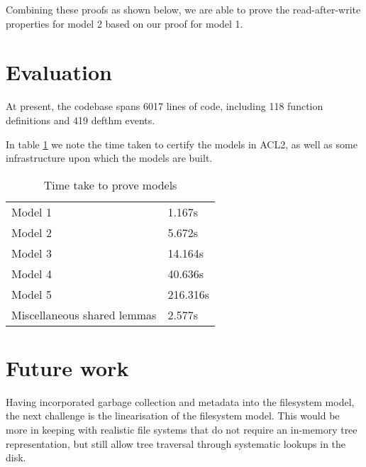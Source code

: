 \documentclass[format=sigconf,review=true]{acmart}
\begin{document}
Combining these proofs as shown below, we are able to prove the read-after-write
properties for model 2 based on our proof for model 1.


\section{Evaluation}
At present, the codebase spans 6017 lines of code, including 118
function definitions and 419 defthm events.

In table \ref{certification-timing-table} we note the time taken to certify
the models in ACL2, as well as some infrastructure upon which the
models are built.

\begin{table}[]
  \centering
  \caption{Time take to prove models}
  \label{certification-timing-table}
  \begin{tabular}{ll}
    Model 1 & 1.167s \\
    Model 2 & 5.672s \\
    Model 3 & 14.164s \\
    Model 4 & 40.636s \\
    Model 5 & 216.316s \\
    Miscellaneous shared lemmas & 2.577s \\
  \end{tabular}
\end{table}

\section{Future work}
Having incorporated garbage collection and metadata into the
filesystem model, the next challenge is the linearisation of the
filesystem model. This would be more in keeping
with realistic file systems that do not require an in-memory tree
representation, but still allow tree traversal through systematic
lookups in the disk.
\end{document}
